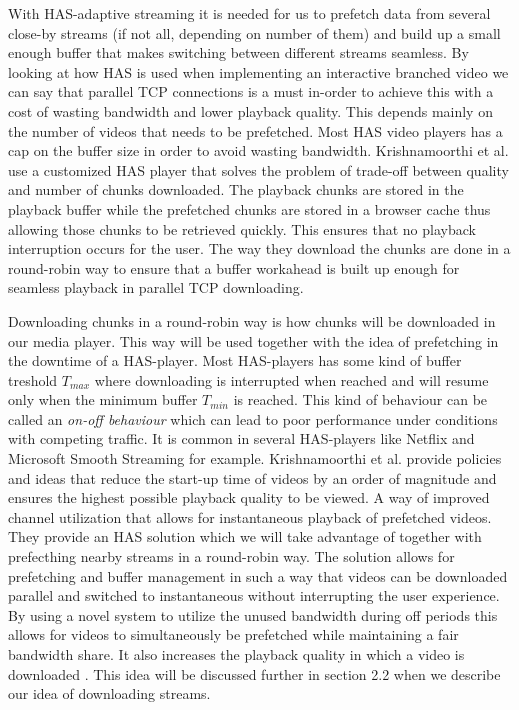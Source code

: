 \documentclass[9pt,a4paper]{acmproc}
\begin{document}
With HAS-adaptive streaming it is needed for us to prefetch data from several close-by streams (if not all, depending on number of them) and build up a small enough buffer that makes switching between different streams seamless. By looking at how HAS is used when implementing an interactive branched video we can say that parallel TCP connections is a must in-order to achieve this with a cost of wasting bandwidth and lower playback quality. This depends mainly on the number of videos that needs to be prefetched. Most HAS video players has a cap on the buffer size in order to avoid wasting bandwidth. Krishnamoorthi et al. \cite{qualbranch} use a customized HAS player that solves the problem of trade-off between quality and number of chunks downloaded. The playback chunks are stored in the playback buffer while the prefetched chunks are stored in a browser cache thus allowing those chunks to be retrieved quickly. This ensures that no playback interruption occurs for the user. The way they download the chunks are done in a round-robin way to ensure that a buffer workahead is built up enough for seamless playback in parallel TCP downloading. 

Downloading chunks in a round-robin way is how chunks will be downloaded in our media player. This way will be used together with the idea of prefetching in the downtime of a HAS-player. Most HAS-players has some kind of buffer treshold $T_{max}$ where downloading is interrupted when reached and will resume only when the minimum buffer $T_{min}$ is reached. This kind of behaviour can be called an \textit{on-off behaviour} which can lead to poor performance under conditions with competing traffic. It is common in several HAS-players like Netflix and Microsoft Smooth Streaming for example. Krishnamoorthi et al. \cite{bandawarePrefetch} provide policies and ideas that reduce the start-up time of videos by an order of magnitude and ensures the highest possible playback quality to be viewed. A way of improved channel utilization that allows for instantaneous playback of prefetched videos. They provide an HAS solution which we will take advantage of together with prefecthing nearby streams in a round-robin way. The solution allows for prefetching and buffer management in such a way that videos can be downloaded parallel and switched to instantaneous without interrupting the user experience. By using a novel system to utilize the unused bandwidth during off periods this allows for videos to simultaneously be prefetched while maintaining a fair bandwidth share. It also increases the playback quality in which a video is downloaded \cite{bandawarePrefetch}. This idea will be discussed further in section 2.2 when we describe our idea of downloading streams.
\end{document}
